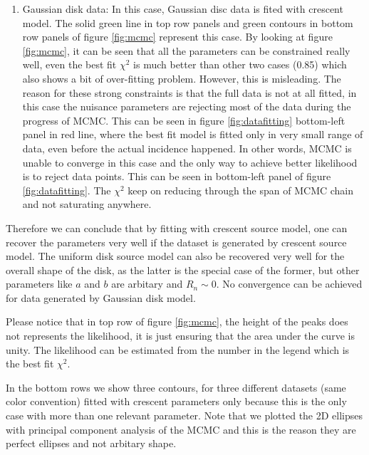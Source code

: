 \begin{enumerate}
\item Gaussian disk data: In this case, Gaussian disc data is fited with crescent model. The solid green line in top row panels and green contours in bottom row panels of figure \ref{fig:mcmc} represent this case. By looking at figure \ref{fig:mcmc}, it can be seen that all the parameters can be constrained really well, even the best fit $\chi^2$ is much better than other two cases (0.85) which also shows a bit of over-fitting problem. However, this is misleading. The reason for these strong constraints is that the full data is not at all fitted, in this case the nuisance parameters are rejecting most of the data during the progress of MCMC. This can be seen in figure \ref{fig:datafitting} bottom-left panel in red line, where the best fit model is fitted only in very small range of data, even before the actual incidence happened. In other words, MCMC is unable to converge in this case and the only way to achieve better likelihood is to reject data points. This can be seen in bottom-left panel of figure \ref{fig:datafitting}. The $\chi^2$ keep on reducing through the span of MCMC chain and not saturating anywhere. 

\end{enumerate}

Therefore we can conclude that by fitting with crescent source model, one can recover the parameters very well if the dataset is generated by crescent source model. The uniform disk source model can also be recovered very well for the overall shape of the disk, as the latter is the special case of the former, but other parameters like $a$ and $b$ are arbitary and $R_n \sim 0$. No convergence can be achieved for data generated by Gaussian disk model. 

Please notice that in top row of figure \ref{fig:mcmc}, the height of the peaks does not represents the likelihood, it is just ensuring that the area under the curve is unity. The likelihood can be estimated from the number in the legend which is the best fit $\chi^2$.


 In the bottom rows we show three contours, for three different datasets (same color convention) fitted with crescent parameters only because this is the only case with more than one relevant parameter. Note that we plotted the 2D ellipses with principal component analysis of the MCMC and this is the reason they are perfect ellipses and not arbitary shape.

